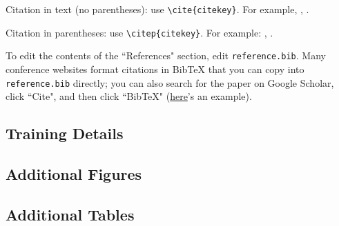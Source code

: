 \documentclass[12pt,letterpaper]{article}
\begin{document}
Citation in text (no parentheses): use \texttt{{\textbackslash}cite\{citekey\}}. 
For example, \cite{breiman2011}, \cite{devlin2019bert}.

Citation in parentheses: use \texttt{{\textbackslash}citep\{citekey\}}. 
For example: \citep{vaswani2023attention}, \citep{karras2019stylebased}.



\makereference

{\color{blue} To edit the contents of the ``References" section, edit \texttt{reference.bib}. Many conference websites format citations in BibTeX that you can copy into \texttt{reference.bib} directly; you can also search for the paper on Google Scholar, click ``Cite", and then click ``BibTeX" (\href{https://scholar.google.com/scholar?hl=en&as_sdt=0%2C23&q=attention+is+all+you+need&btnG=#d=gs_cit&t=1700436667623&u=%2Fscholar%3Fq%3Dinfo%3A5Gohgn6QFikJ%3Ascholar.google.com%2F%26output%3Dcite%26scirp%3D0%26hl%3Den}{here}'s an example).}





\clearpage
\makeappendix

\subsection{Training Details}

\subsection{Additional Figures}

\subsection{Additional Tables}
\end{document}
